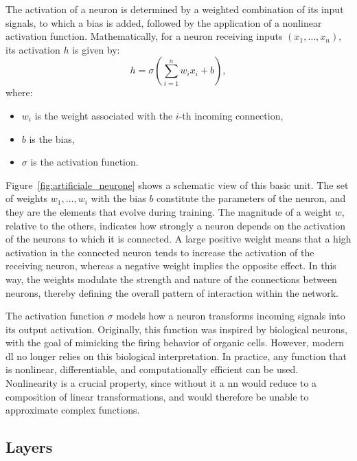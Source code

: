 The activation of a neuron is determined by a weighted combination of its input signals, to which a bias is added, followed by the application of a nonlinear activation function.
Mathematically, for a neuron receiving inputs $(x_1, \dots, x_n)$, its activation $h$ is given by:
\begin{equation}
h = \sigma\left(\sum_{i=1}^{n} w_i x_i + b\right),
\label{eq:neuron_activation}
\end{equation}
where:
\begin{itemize}
\item $w_i$ is the weight associated with the $i$-th incoming connection,
\item $b$ is the bias,
\item $\sigma$ is the activation function.
\end{itemize}

Figure~\ref{fig:artificiale_neurone} shows a schematic view of this basic unit.
The set of weights $w_1, \dots, w_i$ with the bias $b$ constitute the parameters of the neuron, and they are the elements that evolve during training.
The magnitude of a weight $w$, relative to the others, indicates how strongly a neuron depends on the activation of the neurons to which it is connected.
A large positive weight means that a high activation in the connected neuron tends to increase the activation of the receiving neuron, whereas a negative weight implies the opposite effect.
In this way, the weights modulate the strength and nature of the connections between neurons, thereby defining the overall pattern of interaction within the network.



The activation function $\sigma$ models how a neuron transforms incoming signals into its output activation.
Originally, this function was inspired by biological neurons, with the goal of mimicking the firing behavior of organic cells.
However, modern \gls{dl} no longer relies on this biological interpretation.
In practice, any function that is nonlinear, differentiable, and computationally efficient can be used.
Nonlinearity is a crucial property, since without it a \gls{nn} would reduce to a composition of linear transformations, and would therefore be unable to approximate complex functions.

\subsection{Layers}

